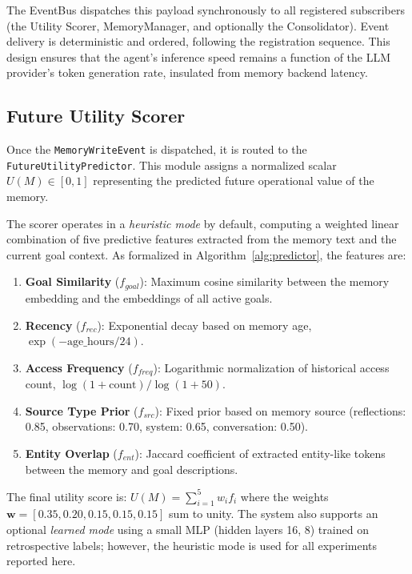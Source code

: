 \documentclass[conference]{IEEEtran}
\begin{document}
The EventBus dispatches this payload synchronously to all registered subscribers (the Utility Scorer, MemoryManager, and optionally the Consolidator). Event delivery is deterministic and ordered, following the registration sequence. This design ensures that the agent's inference speed remains a function of the LLM provider's token generation rate, insulated from memory backend latency.

\subsection{Future Utility Scorer}
Once the \texttt{MemoryWriteEvent} is dispatched, it is routed to the \texttt{FutureUtilityPredictor}. This module assigns a normalized scalar $U(M) \in [0,1]$ representing the predicted future operational value of the memory.

The scorer operates in a \textit{heuristic mode} by default, computing a weighted linear combination of five predictive features extracted from the memory text and the current goal context. As formalized in Algorithm~\ref{alg:predictor}, the features are:

\begin{enumerate}
    \item \textbf{Goal Similarity} ($f_{goal}$): Maximum cosine similarity between the memory embedding and the embeddings of all active goals.
    \item \textbf{Recency} ($f_{rec}$): Exponential decay based on memory age, $\exp(-\text{age\_hours}/24)$.
    \item \textbf{Access Frequency} ($f_{freq}$): Logarithmic normalization of historical access count, $\log(1{+}\text{count})/\log(1{+}50)$.
    \item \textbf{Source Type Prior} ($f_{src}$): Fixed prior based on memory source (reflections: 0.85, observations: 0.70, system: 0.65, conversation: 0.50).
    \item \textbf{Entity Overlap} ($f_{ent}$): Jaccard coefficient of extracted entity-like tokens between the memory and goal descriptions.
\end{enumerate}

The final utility score is: $U(M) = \sum_{i=1}^{5} w_i f_i$ where the weights $\mathbf{w} = [0.35, 0.20, 0.15, 0.15, 0.15]$ sum to unity. The system also supports an optional \textit{learned mode} using a small MLP (hidden layers 16, 8) trained on retrospective labels; however, the heuristic mode is used for all experiments reported here.
\end{document}
